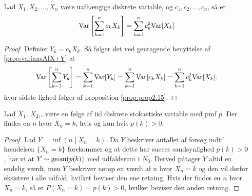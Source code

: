 \begin{cor} \label{cor:variansAfLinearKombinationAfUafhængigeVariable}
  Lad $X_{1}, X_{2}, \ldots, X_{n}$ være uafhængige diskrete variable, og $c_{1}, c_{2}, \ldots, c_{n}$, så er
  \begin{equation*}
    \textnormal{Var}\left[\sum^{n}_{k = 1} c_{k}X_{k}\right] = \sum_{k=1}^n c_{k}^{2} \textnormal{Var}[X_{k}]
  \end{equation*}
\end{cor}
\begin{proof}
  Definier $Y_{k} = c_{k}X_{k}$. Så følger det ved gentagende benyttelse af
  \ref{prop:variansAfX+Y} at
  \begin{equation*}
    \textnormal{Var}\left[\sum_{k=1}^n Y_{k}\right] = \sum_{k=1}^n \textnormal{Var}[Y_{k}] = \sum_{k=1}^n \textnormal{Var}[c_{k}X_{k}] = \sum_{k=1}^n c_{k}^{2}\textnormal{Var}[X_{k}].
  \end{equation*}
  hvor sidste lighed følger af proposition \ref{prop:prop2.15}.
\end{proof}

\begin{prop}
    Lad $X_1$, $X_2$,\dots være en følge af iid diskrete stokastiske variable med pmf $p$.
    Der findes en $n$ hvor $X_n=k$, hvis og kun hvis $p(k)>0$.
\end{prop}

\begin{proof}
    Lad $Y=\inf(n\mid X_n=k)$.
    Da $Y$ beskriver antallet af forsøg indtil hændelsen $\{X_n=k\}$ forekommer og at dette har succes sandsynlighed $p(k)>0$, har vi at $Y\sim \textnormal{geom}(p(k))$ med udfaldsrum i $N_0$.
    Derved påtager $Y$ altid en endelig værdi, men $Y$ beskriver netop en værdi af $n$ hvor $X_n=k$ og den vil derfor eksistere i alle udfald, hvilket beviser den ene retning. Hvis der findes en $n$ hvor $X_n=k$, så er $P(X_n=k)=p(k)>0$, hvilket beviser den anden retning.
\end{proof}